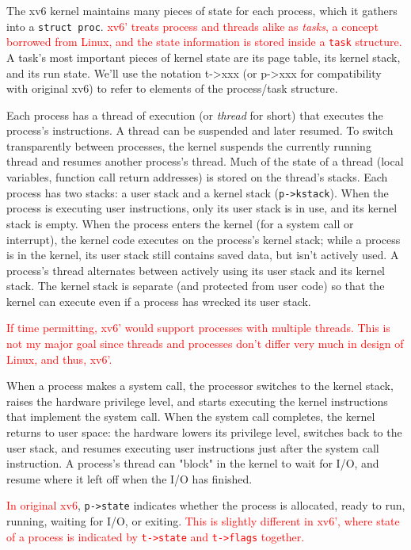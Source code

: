 \documentclass{report}
\begin{document}
	The xv6 kernel maintains many pieces of state for each process, which it gathers
	into a \texttt{struct proc}. \textcolor{red}{
		xv6' treats process and threads alike as \emph{tasks}, a concept borrowed from
		Linux, and the state information is stored inside a
		\texttt{task}
		structure.
	} A task's most important pieces of kernel state are its
	page table, its kernel stack, and its run state. We'll use the notation t->xxx 
	(or p->xxx for compatibility with original xv6) to refer to
	elements of the process/task structure.
	
	Each process has a thread of execution (or \emph{thread} for short) that executes the
	process's instructions. A thread can be suspended and later resumed. To switch
	transparently between processes, the kernel suspends the currently running thread and
	resumes another process's thread. Much of the state of a thread (local variables, function
	call return addresses) is stored on the thread's stacks. Each process has two stacks: a
	user stack and a kernel stack (\texttt{p->kstack}). When the process is executing user
	instructions, only its user stack is in use, and its kernel stack is empty. When the
	process enters the kernel (for a system call or interrupt), the kernel code executes on the
	process's kernel stack; while a process is in the kernel, its user stack still contains saved
	data, but isn't actively used. A process's thread alternates between actively using its
	user stack and its kernel stack. The kernel stack is separate (and protected from user
	code) so that the kernel can execute even if a process has wrecked its user stack.
	
	\textcolor{red}{
		If time permitting, xv6' would support processes with multiple threads.  This is not
		my major goal since threads and processes don't differ very much in design of Linux, and thus,
		xv6'.
	}
	
	When a process makes a system call, the processor switches to the kernel stack,
	raises the hardware privilege level, and starts executing the kernel instructions that 
	implement the system call. When the system call completes, the kernel returns to user
	space: the hardware lowers its privilege level, switches back to the user stack, and 
	resumes executing user instructions just after the system call instruction. A process's
	thread can "block" in the kernel to wait for I/O, and resume where it left off when the
	I/O has finished.
	
	\textcolor{red}{In original xv6}, \texttt{p->state} indicates whether the process is 
	allocated, ready to run, running, waiting for I/O, or exiting.  \textcolor{red}{
		This is slightly different in xv6', where state of a process is indicated by
		\texttt{t->state} and \texttt{t->flags} together.
	}
	
\end{document}
